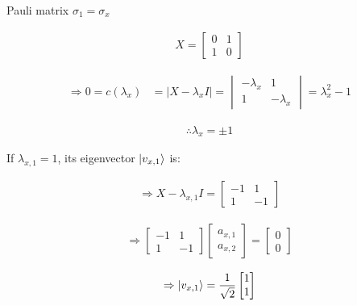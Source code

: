 Pauli matrix $\sigma_1=\sigma_x$

\begin{align}
  \label{eq:2.11.1}
  X=
  \begin{bmatrix}
    0 & 1 \\
    1 & 0
  \end{bmatrix}
\end{align}

\begin{align}
  \label{eq:2.11.2}
  \Rightarrow 0 = c(\lambda_x)&=|X-\lambda_x I|
  =
  \begin{vmatrix}
    -\lambda_x & 1 \\
    1 & -\lambda_x
  \end{vmatrix}
  =\lambda_x^2-1
\end{align}

\begin{align}
  \label{eq:2.11.3}
  \therefore \lambda_x=\pm 1
\end{align}

If $\lambda_{x,1}=1$, its eigenvector $\ket{v_{x,1}}$ is:

\begin{align}
  \label{eq:2.11.4}
  \Rightarrow X-\lambda_{x,1} I
  =
  \begin{bmatrix}
    -1 & 1 \\
    1 & -1
  \end{bmatrix} 
\end{align}

\begin{align}
  \label{eq:2.11.5}
  \Rightarrow
  \begin{bmatrix}
    -1 & 1 \\
    1 & -1
  \end{bmatrix}
  \begin{bmatrix}
    a_{x,1} \\
    a_{x,2}
  \end{bmatrix}
  =
  \begin{bmatrix}
    0 \\
    0
  \end{bmatrix}
\end{align}

\begin{align}
  \label{eq:2.11.6}
  \Rightarrow \ket{v_{x,1}} = \frac{1}{\sqrt{2}}
  \begin{bmatrix}
    1 \\
    1
  \end{bmatrix} 
\end{align}

